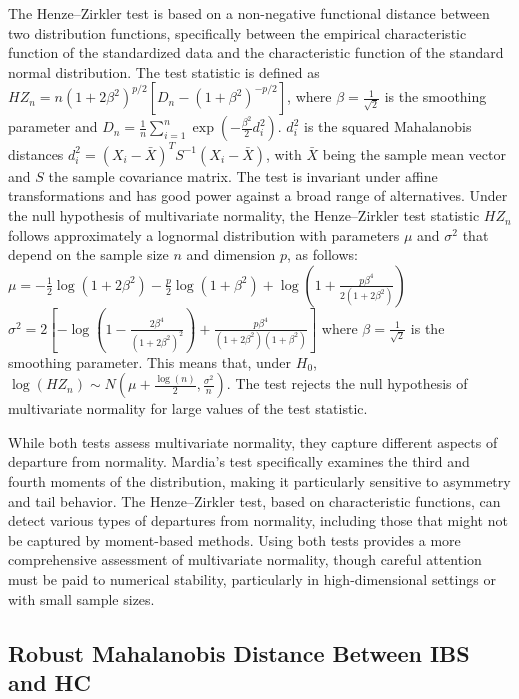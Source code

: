 \documentclass[diagnostics,article,accept,pdftex,moreauthors]{Definitions/mdpi}
\begin{document}
The Henze--Zirkler test is based on a non-negative functional distance between two distribution functions, specifically between the empirical characteristic function of the standardized data and the characteristic function of the standard normal distribution. The test statistic is defined as $HZ_n = n\left(1 + 2\beta^2\right)^{p/2}\left[D_n - \left(1 + \beta^2\right)^{-p/2}\right]$, where $\beta = \frac{1}{\sqrt{2}}$ is the smoothing parameter and $D_n = \frac{1}{n}\sum_{i=1}^n \exp\left(-\frac{\beta^2}{2}d_i^2\right)$. $d_i^2$ is the squared Mahalanobis distances
$d_i^2 = (X_i - \bar{X})^T S^{-1}(X_i - \bar{X})$, with $\bar{X}$ being the sample mean vector and $S$ the sample covariance matrix. The test is invariant under affine transformations and has good power against a broad range of alternatives. Under the null hypothesis of multivariate normality, the Henze--Zirkler test statistic $HZ_n$ follows approximately a lognormal distribution with parameters $\mu$ and $\sigma^2$ that depend on the sample size $n$ and dimension $p$, as follows:
$\mu = -\frac{1}{2}\log(1 + 2\beta^2) - \frac{p}{2}\log(1 + \beta^2) + \log\left(1 + \frac{p\beta^4}{2(1 + 2\beta^2)}\right)$
$\sigma^2 = 2\left[-\log(1 - \frac{2\beta^4}{(1 + 2\beta^2)^2}) + \frac{p\beta^4}{(1 + 2\beta^2)(1 + \beta^2)}\right]$
where $\beta = \frac{1}{\sqrt{2}}$ is the smoothing parameter. This means that, under $H_0$, $\log(HZ_n) \sim N(\mu + \frac{\log(n)}{2}, \frac{\sigma^2}{n})$. The test rejects the null hypothesis of multivariate normality for large values of the test statistic.

While both tests assess multivariate normality, they capture different aspects of departure from normality. Mardia's test specifically examines the third and fourth moments of the distribution, making it particularly sensitive to asymmetry and tail behavior. The Henze--Zirkler test, based on characteristic functions, can detect various types of departures from normality, including those that might not be captured by moment-based methods. Using both tests provides a more comprehensive assessment of multivariate normality, though careful attention must be paid to numerical stability, particularly in high-dimensional settings or with small sample sizes.


\subsection{Robust Mahalanobis Distance Between IBS and HC}
\label{A:robust-mahalanobis}
\end{document}
